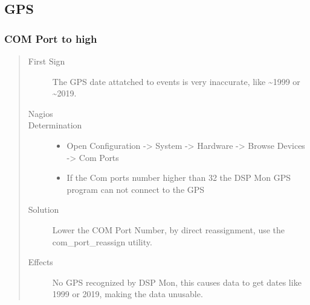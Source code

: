 \documentclass[a4paper,11pt,english]{sphinxmanual}
\begin{document}
\subsection{GPS}
\label{known-issues:gps}

\subsubsection{COM Port to high}
\label{known-issues:com-port-to-high}\begin{quote}\begin{description}
\item[{First Sign}] \leavevmode
The GPS date attatched to events is very inaccurate, like \textasciitilde{}1999 or \textasciitilde{}2019.

\item[{Nagios}] \leavevmode
\item[{Determination}] \leavevmode\begin{itemize}
\item {} 
Open Configuration -\textgreater{} System -\textgreater{} Hardware -\textgreater{} Browse Devices -\textgreater{} Com Ports

\item {} 
If the Com ports number higher than 32 the DSP Mon GPS program can not connect to the GPS

\end{itemize}

\item[{Solution}] \leavevmode
Lower the COM Port Number, by direct reassignment, use the com\_port\_reassign utility.

\item[{Effects}] \leavevmode
No GPS recognized by DSP Mon, this causes data to get dates like 1999 or 2019, making the data unusable.

\end{description}\end{quote}
\end{document}
